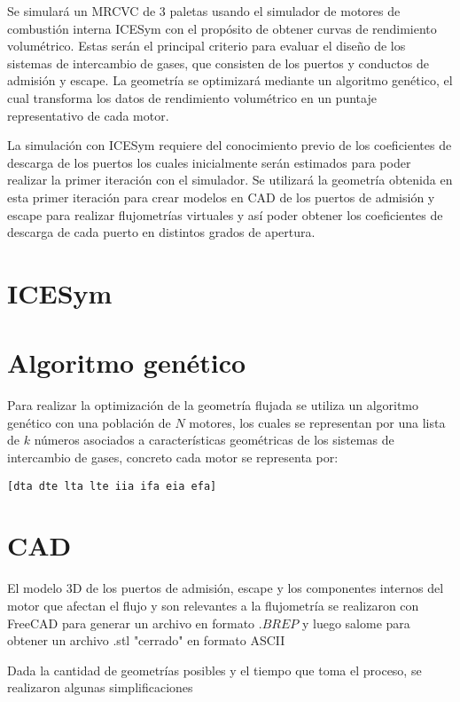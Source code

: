 Se simulará un MRCVC de 3 paletas usando el simulador de motores de combustión
interna ICESym \cite{icesym} con el propósito de obtener curvas de rendimiento
volumétrico.
%
Estas serán el principal criterio para evaluar el diseño de los sistemas de
intercambio de gases, que consisten de los puertos y conductos de admisión y
escape.
%
La geometría se optimizará mediante un algoritmo genético, el cual transforma
los datos de rendimiento volumétrico en un puntaje representativo de cada
motor.


La simulación con ICESym requiere del conocimiento previo de los coeficientes
de descarga de los puertos los cuales inicialmente serán estimados para poder
realizar la primer iteración con el simulador.
%
Se utilizará la geometría obtenida en esta primer iteración para crear modelos
en CAD de los puertos de admisión y escape para realizar flujometrías virtuales
y así poder obtener los coeficientes de descarga de cada puerto en distintos
grados de apertura.


\section{ICESym}



\section{Algoritmo genético}

Para realizar la optimización de la geometría flujada se utiliza un algoritmo
genético con una población de $N$ motores, los cuales se representan por una
lista de $k$ números asociados a características geométricas de los sistemas de
intercambio de gases, concreto cada motor se representa por:

\begin{verbatim}
[dta dte lta lte iia ifa eia efa]
\end{verbatim}


\section{CAD}
El modelo 3D de los puertos de admisión, escape y los componentes internos del
motor que afectan el flujo y son relevantes a la flujometría se realizaron con
FreeCAD\cite{freecad} para generar un archivo en formato $.BREP$ y luego
salome\cite{salome} para obtener un archivo .stl "cerrado" en formato ASCII

Dada la cantidad de geometrías posibles y el tiempo que toma el proceso, se
realizaron algunas simplificaciones


